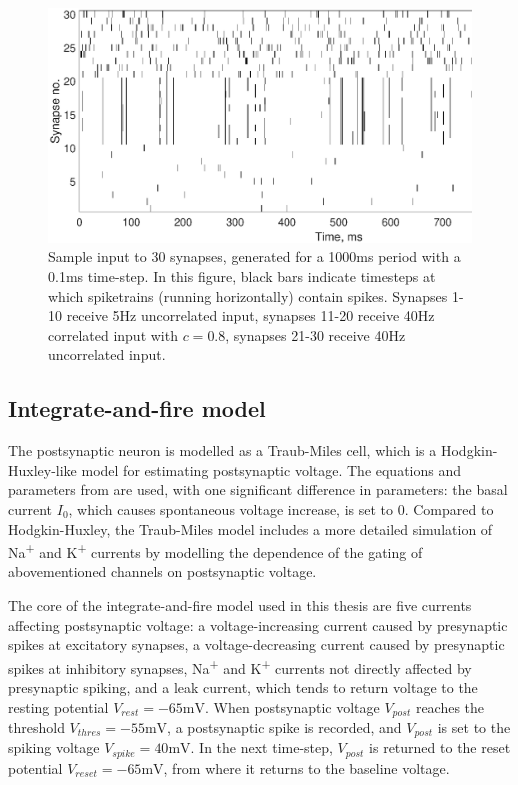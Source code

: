 \documentclass[a4paper,12pt]{report}
\theoremstyle{definition}
\begin{document}
\begin{figure}[h]
    \includegraphics[width=\textwidth]{figures/methods_sample_input.eps}
    \caption{Sample input to 30 synapses, generated for a 1000ms period with a 0.1ms time-step. In this figure, black bars indicate timesteps at which spiketrains (running horizontally) contain spikes. Synapses 1-10 receive 5Hz uncorrelated input, synapses 11-20 receive 40Hz correlated input with $c=0.8$, synapses 21-30 receive 40Hz uncorrelated input.}
    \label{fig:methods_sample_input}
\end{figure}




\subsection{Integrate-and-fire model}

The postsynaptic neuron is modelled as a Traub-Miles cell, which is a Hodgkin-Huxley-like model for estimating postsynaptic voltage. The equations and parameters from \cite{ermentrout1998fine} are used, with one significant difference in parameters: the basal current $I_0$, which causes spontaneous voltage increase, is set to $0$. Compared to Hodgkin-Huxley, the Traub-Miles model includes a more detailed simulation of Na\textsuperscript{+} and K\textsuperscript{+} currents by modelling the dependence of the gating of abovementioned channels on postsynaptic voltage.

The core of the integrate-and-fire model used in this thesis are five currents affecting postsynaptic voltage: a voltage-increasing current caused by presynaptic spikes at excitatory synapses, a voltage-decreasing current caused by presynaptic spikes at inhibitory synapses, Na\textsuperscript{+} and K\textsuperscript{+} currents not directly affected by presynaptic spiking, and a leak current, which tends to return voltage to the resting potential $V_{rest}=-65\mathrm{mV}$. When postsynaptic voltage $V_{post}$ reaches the threshold $V_{thres}=-55\mathrm{mV}$, a postsynaptic spike is recorded, and $V_{post}$ is set to the spiking voltage $V_{spike}=40\mathrm{mV}$. In the next time-step, $V_{post}$ is returned to the reset potential $V_{reset}=-65\mathrm{mV}$, from where it returns to the baseline voltage.
\end{document}
